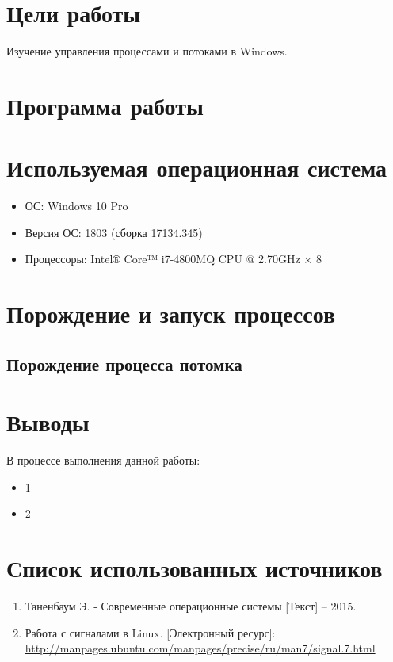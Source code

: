 





\tableofcontents
\newpage

\section{Цели работы}

Изучение управления процессами и потоками в Windows.

\section{Программа работы}



\section{Используемая операционная система}

\begin{itemize}
	\item ОС: Windows 10 Pro
	\item Версия ОС: 1803 (сборка 17134.345)
	\item Процессоры: Intel® Core™ i7-4800MQ CPU @ 2.70GHz × 8
\end{itemize}

\newpage

\section{Порождение и запуск процессов}

\subsection{Порождение процесса потомка}

%

\newpage

\section{Выводы}

В процессе выполнения данной работы:
\begin{itemize}
	\item 1
	\item 2
\end{itemize}

\section*{Список использованных источников}

\begin{enumerate}
	\item Таненбаум Э. - Современные операционные системы [Текст] -- 2015.
	\item Работа с сигналами в Linux. [Электронный ресурс]:\\
		{\small\url{http://manpages.ubuntu.com/manpages/precise/ru/man7/signal.7.html}} 
\end{enumerate}



